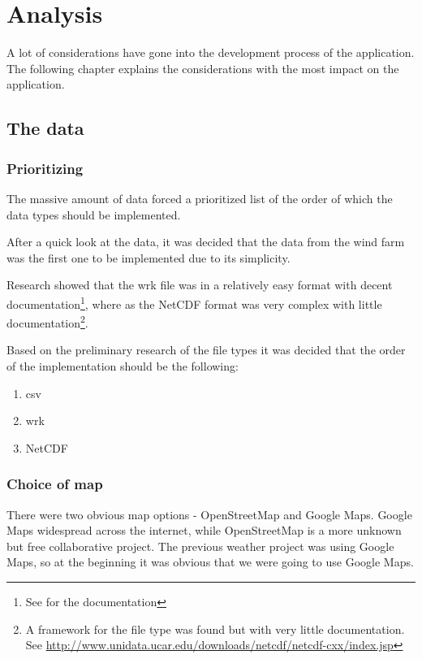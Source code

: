 \chapter{Analysis}
\label{sec:analysis}
A lot of considerations have gone into the development process of the application. The following chapter explains the considerations with the most impact on the application.

\section{The data}
\label{sec:the_data}
\subsection{Prioritizing}
\label{sec:prioritizing}
The massive amount of data forced a prioritized list of the order of which the data types should be implemented.

After a quick look at the data, it was decided that the data from the wind farm was the first one to be implemented due to its simplicity.

Research showed that the wrk file was in a relatively easy format with decent documentation\footnote{See \cite{VRIS} for the documentation}, where as the NetCDF format was very complex with little documentation\footnote{A framework for the file type was found but with very little documentation. See \url{http://www.unidata.ucar.edu/downloads/netcdf/netcdf-cxx/index.jsp}}.

Based on the preliminary research of the file types it was decided that the order of the implementation should be the following:
\begin{enumerate}
\item csv
\item wrk
\item NetCDF
\end{enumerate}

\subsection{Choice of map}
\label{sec:analysis_choice_of_map}
There were two obvious map options - OpenStreetMap and Google Maps. Google Maps widespread across the internet, while OpenStreetMap is a more unknown but free collaborative project. The previous weather project was using Google Maps, so at the beginning it was obvious that we were going to use Google Maps.

